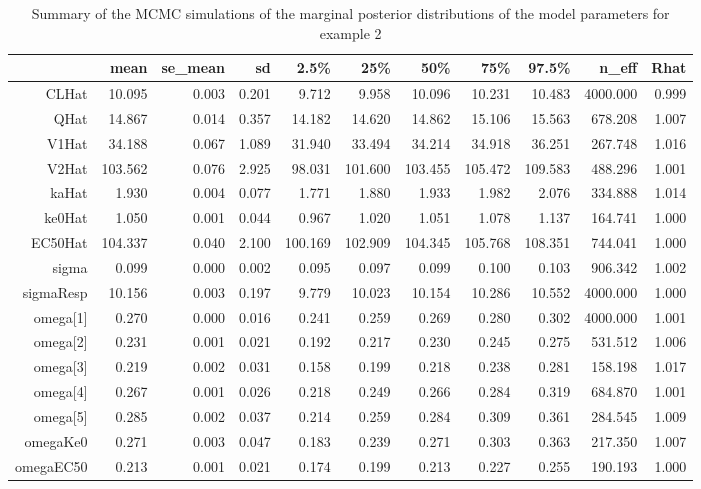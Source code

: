 \documentclass[11pt]{amsart}
\begin{document}
\begin{table}[!htb]
\centering
\caption{Summary of the MCMC simulations of the marginal posterior distributions of the model parameters for example 2}
\begin{tabular}{rrrrrrrrrrr}
  \hline
 & mean & se\_mean & sd & 2.5\% & 25\% & 50\% & 75\% & 97.5\% & n\_eff & Rhat \\ 
  \hline
CLHat & 10.095 & 0.003 & 0.201 & 9.712 & 9.958 & 10.096 & 10.231 & 10.483 & 4000.000 & 0.999 \\
QHat & 14.867 & 0.014 & 0.357 & 14.182 & 14.620 & 14.862 & 15.106 & 15.563 & 678.208 & 1.007 \\
V1Hat & 34.188 & 0.067 & 1.089 & 31.940 & 33.494 & 34.214 & 34.918 & 36.251 & 267.748 & 1.016 \\
V2Hat & 103.562 & 0.076 & 2.925 & 98.031 & 101.600 & 103.455 & 105.472 & 109.583 & 488.296 & 1.001 \\
kaHat & 1.930 & 0.004 & 0.077 & 1.771 & 1.880 & 1.933 & 1.982 & 2.076 & 334.888 & 1.014 \\
ke0Hat & 1.050 & 0.001 & 0.044 & 0.967 & 1.020 & 1.051 & 1.078 & 1.137 & 164.741 & 1.000 \\
EC50Hat & 104.337 & 0.040 & 2.100 & 100.169 & 102.909 & 104.345 & 105.768 & 108.351 & 744.041 & 1.000 \\
sigma & 0.099 & 0.000 & 0.002 & 0.095 & 0.097 & 0.099 & 0.100 & 0.103 & 906.342 & 1.002 \\
sigmaResp & 10.156 & 0.003 & 0.197 & 9.779 & 10.023 & 10.154 & 10.286 & 10.552 & 4000.000 & 1.000 \\
omega[1] & 0.270 & 0.000 & 0.016 & 0.241 & 0.259 & 0.269 & 0.280 & 0.302 & 4000.000 & 1.001 \\
omega[2] & 0.231 & 0.001 & 0.021 & 0.192 & 0.217 & 0.230 & 0.245 & 0.275 & 531.512 & 1.006 \\
omega[3] & 0.219 & 0.002 & 0.031 & 0.158 & 0.199 & 0.218 & 0.238 & 0.281 & 158.198 & 1.017 \\
omega[4] & 0.267 & 0.001 & 0.026 & 0.218 & 0.249 & 0.266 & 0.284 & 0.319 & 684.870 & 1.001 \\
omega[5] & 0.285 & 0.002 & 0.037 & 0.214 & 0.259 & 0.284 & 0.309 & 0.361 & 284.545 & 1.009 \\
omegaKe0 & 0.271 & 0.003 & 0.047 & 0.183 & 0.239 & 0.271 & 0.303 & 0.363 & 217.350 & 1.007 \\
omegaEC50 & 0.213 & 0.001 & 0.021 & 0.174 & 0.199 & 0.213 & 0.227 & 0.255 & 190.193 & 1.000 \\
  \hline
\end{tabular}
\end{table}
\end{document}
